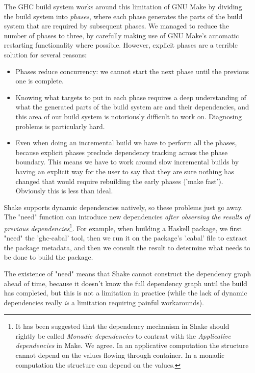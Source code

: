The GHC build system works around this limitation of GNU Make by
dividing the build system into \emph{phases}, where each phase
generates the parts of the build system that are required by
subsequent phases. We managed to reduce the number of phases to
three, by carefully making use of GNU Make's automatic restarting
functionality where possible. However, explicit phases are a terrible
solution for several reasons:

\begin{itemize}
\item Phases reduce concurrency: we cannot start the next phase until
  the previous one is complete.
\item Knowing what targets to put in each phase requires a deep
  understanding of what the generated parts of the build system are
  and their dependencies, and this area of our build system is
  notoriously difficult to work on.  Diagnosing problems is
  particularly hard.
\item Even when doing an incremental build we have to perform all the
  phases, because explicit phases preclude dependency tracking across
  the phase boundary.  This means we have to work around slow
  incremental builds by having an explicit way for the user to say
  that they are sure nothing has changed that would require rebuilding
  the early phases (\lst'make fast').  Obviously this is less than
  ideal.
\end{itemize}

Shake supports dynamic dependencies natively, so these problems just
go away.  The \lst"need" function can introduce new dependencies
\emph{after observing the results of previous dependencies}\footnote{It has been
suggested that the dependency mechanism in Shake should rightly be called
\emph{Monadic dependencies} to contrast with the \emph{Applicative dependencies}
in Make. We agree. In an applicative computation the structure cannot depend on
the values flowing through container. In a monadic computation the structure can
depend on the values.}. For example, when building a Haskell package, we first
\lst"need" the \lst'ghc-cabal' tool, then we run it on the package's \lst'.cabal' file to
extract the package metadata, and then we consult the result to determine what
needs to be done to build the package.

The existence of \lst"need" means that Shake cannot construct the
dependency graph ahead of time, because it doesn't know the full
dependency graph until the build has completed, but this is not a
limitation in practice (while the lack of dynamic dependencies really
\emph{is} a limitation requiring painful workarounds).

